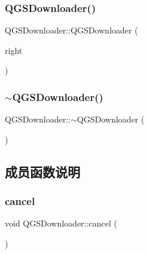 \subsubsection{\texorpdfstring{Q\+G\+S\+Downloader()}{QGSDownloader()}\hspace{0.1cm}{\footnotesize\ttfamily [3/3]}}
{\footnotesize\ttfamily Q\+G\+S\+Downloader\+::\+Q\+G\+S\+Downloader (\begin{DoxyParamCaption}\item[{\mbox{\hyperlink{class_q_g_s_downloader}{Q\+G\+S\+Downloader}} \&\&}]{right }\end{DoxyParamCaption})\hspace{0.3cm}{\ttfamily [delete]}}

\mbox{\label{class_q_g_s_downloader_a310f6a4151b5f2e26a1a3b8ec96ee2a6}} 
\subsubsection{\texorpdfstring{$\sim$\+Q\+G\+S\+Downloader()}{~QGSDownloader()}}
{\footnotesize\ttfamily Q\+G\+S\+Downloader\+::$\sim$\+Q\+G\+S\+Downloader (\begin{DoxyParamCaption}{ }\end{DoxyParamCaption})\hspace{0.3cm}{\ttfamily [virtual]}}



\subsection{成员函数说明}
\mbox{\label{class_q_g_s_downloader_a3679be0467ff9929fdd92b96322d6058}} 
\subsubsection{\texorpdfstring{cancel}{cancel}}
{\footnotesize\ttfamily void Q\+G\+S\+Downloader\+::cancel (\begin{DoxyParamCaption}{ }\end{DoxyParamCaption})\hspace{0.3cm}{\ttfamily [slot]}}

